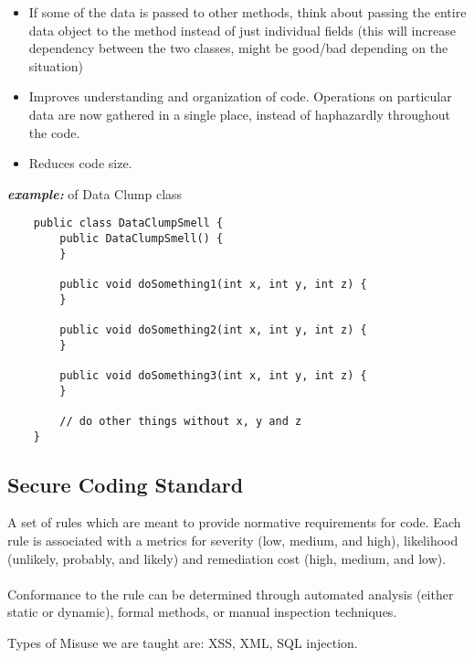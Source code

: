 \documentclass[a4paper]{article}
\begin{document}
\begin{itemize}
\begin{itemize}[label=$\circ$]
		\begin{itemize}[label=\tiny$\blacksquare$]
			\item If some of the data is passed to other methods, think about passing the entire data object to the method instead of just individual fields (this will increase dependency between the two classes, might be good/bad depending on the situation)
			\item Improves understanding and organization of code. Operations on particular data are now gathered in a single place, instead of haphazardly throughout the code.
			\item Reduces code size.
		\end{itemize}
	\end{itemize}
\end{itemize}
\textbf{\textit{example:}} of Data Clump class
\begin{verbatim}
	public class DataClumpSmell {
		public DataClumpSmell() {
		}
		
		public void doSomething1(int x, int y, int z) {
		}
		
		public void doSomething2(int x, int y, int z) {
		}
		
		public void doSomething3(int x, int y, int z) {
		}
		
		// do other things without x, y and z
	}
\end{verbatim}
\subsection{Secure Coding Standard}
A set of rules which are meant to provide normative requirements for code. Each rule is associated with a metrics for severity (low, medium, and high), likelihood (unlikely, probably, and likely) and remediation cost (high, medium, and low).\\
\\
Conformance to the rule can be determined through automated analysis (either static or dynamic), formal methods, or manual inspection techniques.
\begin{framed}
	\begin{displayquote}
		Types of Misuse we are taught are: XSS, XML, SQL injection.
	\end{displayquote}
\end{framed}
\end{document}
